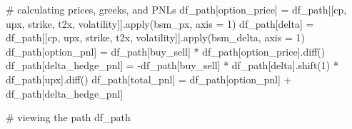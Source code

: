 \documentclass[
  letterpaper,
  DIV=11,
  numbers=noendperiod]{scrreprt}
\newenvironment{Shaded}{\begin{snugshade}}{\end{snugshade}}
\newcommand{\BuiltInTok}[1]{\textcolor[rgb]{0.00,0.23,0.31}{#1}}
\newcommand{\CommentTok}[1]{\textcolor[rgb]{0.37,0.37,0.37}{#1}}
\newcommand{\DecValTok}[1]{\textcolor[rgb]{0.68,0.00,0.00}{#1}}
\newcommand{\NormalTok}[1]{\textcolor[rgb]{0.00,0.23,0.31}{#1}}
\newcommand{\OperatorTok}[1]{\textcolor[rgb]{0.37,0.37,0.37}{#1}}
\newcommand{\StringTok}[1]{\textcolor[rgb]{0.13,0.47,0.30}{#1}}
\begin{document}
\begin{Shaded}
\begin{Highlighting}[]
\CommentTok{\# calculating prices, greeks, and PNLs}
\NormalTok{df\_path[}\StringTok{\textquotesingle{}option\_price\textquotesingle{}}\NormalTok{] }\OperatorTok{=}\NormalTok{ df\_path[[}\StringTok{\textquotesingle{}cp\textquotesingle{}}\NormalTok{, }\StringTok{\textquotesingle{}upx\textquotesingle{}}\NormalTok{, }\StringTok{\textquotesingle{}strike\textquotesingle{}}\NormalTok{, }\StringTok{\textquotesingle{}t2x\textquotesingle{}}\NormalTok{, }\StringTok{\textquotesingle{}volatility\textquotesingle{}}\NormalTok{]].}\BuiltInTok{apply}\NormalTok{(bsm\_px, axis }\OperatorTok{=} \DecValTok{1}\NormalTok{)}
\NormalTok{df\_path[}\StringTok{\textquotesingle{}delta\textquotesingle{}}\NormalTok{] }\OperatorTok{=}\NormalTok{ df\_path[[}\StringTok{\textquotesingle{}cp\textquotesingle{}}\NormalTok{, }\StringTok{\textquotesingle{}upx\textquotesingle{}}\NormalTok{, }\StringTok{\textquotesingle{}strike\textquotesingle{}}\NormalTok{, }\StringTok{\textquotesingle{}t2x\textquotesingle{}}\NormalTok{, }\StringTok{\textquotesingle{}volatility\textquotesingle{}}\NormalTok{]].}\BuiltInTok{apply}\NormalTok{(bsm\_delta, axis }\OperatorTok{=} \DecValTok{1}\NormalTok{)}
\NormalTok{df\_path[}\StringTok{\textquotesingle{}option\_pnl\textquotesingle{}}\NormalTok{] }\OperatorTok{=}\NormalTok{ df\_path[}\StringTok{\textquotesingle{}buy\_sell\textquotesingle{}}\NormalTok{] }\OperatorTok{*}\NormalTok{ df\_path[}\StringTok{\textquotesingle{}option\_price\textquotesingle{}}\NormalTok{].diff()}
\NormalTok{df\_path[}\StringTok{\textquotesingle{}delta\_hedge\_pnl\textquotesingle{}}\NormalTok{] }\OperatorTok{=} \OperatorTok{{-}}\NormalTok{df\_path[}\StringTok{\textquotesingle{}buy\_sell\textquotesingle{}}\NormalTok{] }\OperatorTok{*}\NormalTok{ df\_path[}\StringTok{\textquotesingle{}delta\textquotesingle{}}\NormalTok{].shift(}\DecValTok{1}\NormalTok{) }\OperatorTok{*}\NormalTok{ df\_path[}\StringTok{\textquotesingle{}upx\textquotesingle{}}\NormalTok{].diff()}
\NormalTok{df\_path[}\StringTok{\textquotesingle{}total\_pnl\textquotesingle{}}\NormalTok{] }\OperatorTok{=}\NormalTok{ df\_path[}\StringTok{\textquotesingle{}option\_pnl\textquotesingle{}}\NormalTok{] }\OperatorTok{+}\NormalTok{ df\_path[}\StringTok{\textquotesingle{}delta\_hedge\_pnl\textquotesingle{}}\NormalTok{]}

\CommentTok{\# viewing the path}
\NormalTok{df\_path}
\end{Highlighting}
\end{Shaded}
\end{document}
